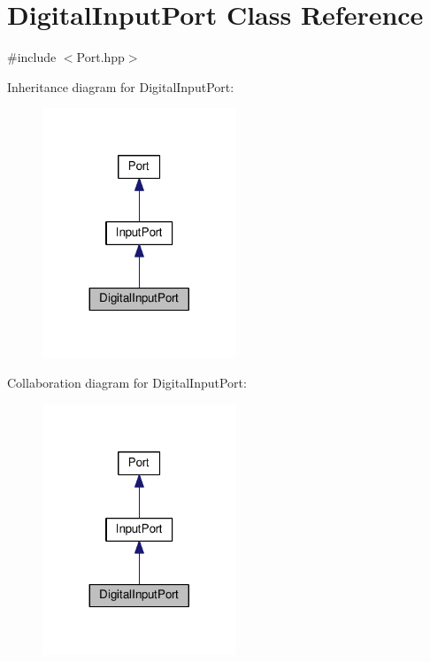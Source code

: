 \hypertarget{classDigitalInputPort}{}\section{Digital\+Input\+Port Class Reference}
\label{classDigitalInputPort}


{\ttfamily \#include $<$Port.\+hpp$>$}



Inheritance diagram for Digital\+Input\+Port\+:\nopagebreak
\begin{figure}[H]
\begin{center}
\leavevmode
\includegraphics[width=164pt]{classDigitalInputPort__inherit__graph}
\end{center}
\end{figure}


Collaboration diagram for Digital\+Input\+Port\+:\nopagebreak
\begin{figure}[H]
\begin{center}
\leavevmode
\includegraphics[width=164pt]{classDigitalInputPort__coll__graph}
\end{center}
\end{figure}
